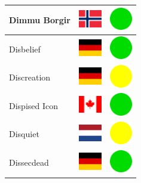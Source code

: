 \documentclass[12pt, a4paper, twoside]{report}
\begin{document}
\begin{center}
\begin{longtable}{|p{5cm}|p{2cm}|p{2cm}|}
Dimmu Borgir & \includegraphics[width=1cm]{4x3/no} & \includegraphics[width=1cm]{likes/y} \\ \hline
Disbelief & \includegraphics[width=1cm]{4x3/de} & \includegraphics[width=1cm]{likes/y} \\ \hline
Discreation & \includegraphics[width=1cm]{4x3/de} & \includegraphics[width=1cm]{likes/m} \\ \hline
Dispised Icon & \includegraphics[width=1cm]{4x3/ca} & \includegraphics[width=1cm]{likes/y} \\ \hline
Disquiet & \includegraphics[width=1cm]{4x3/nl} & \includegraphics[width=1cm]{likes/m} \\ \hline
Dissecdead & \includegraphics[width=1cm]{4x3/de} & \includegraphics[width=1cm]{likes/y} \\ \hline

\end{longtable}
\end{center}
\end{document}
